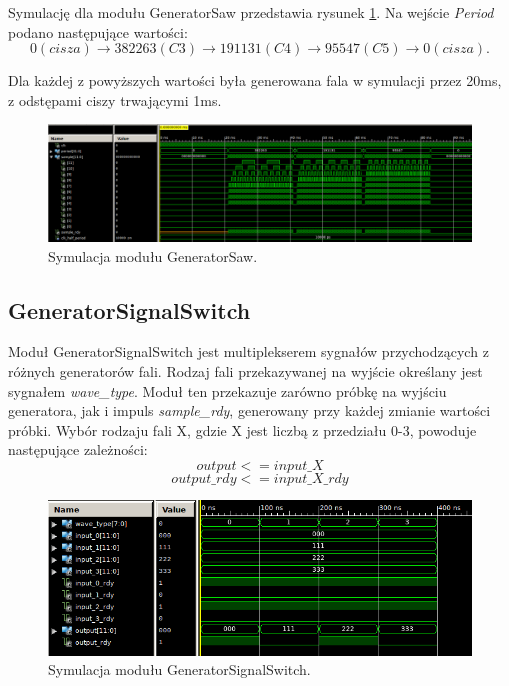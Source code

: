 \documentclass[12pt]{article}
\begin{document}
Symulację dla modułu GeneratorSaw przedstawia rysunek \ref{sim:gen_saw}. Na wejście \textit{Period} podano następujące wartości:
\begin{equation}
  0 (cisza) \rightarrow 382263 (C3) \rightarrow 191131 (C4) \rightarrow 95547 (C5) \rightarrow 0 (cisza).
\end{equation}

Dla każdej z powyższych wartości była generowana fala w symulacji przez 20ms, z odstępami ciszy trwającymi 1ms.

\begin{figure}[h]
  \centering
  \includegraphics[decodearray={1 0 1 0 1 0}, width=\linewidth]{images/generator_saw.png}
  \caption{Symulacja modułu GeneratorSaw.}
  \label{sim:gen_saw}
\end{figure}


\subsection{GeneratorSignalSwitch}

Moduł GeneratorSignalSwitch jest multiplekserem sygnałów przychodzących z różnych generatorów fali. Rodzaj fali przekazywanej na wyjście określany jest sygnałem \textit{wave\_type}. Moduł ten przekazuje zarówno próbkę na wyjściu generatora, jak i impuls \textit{sample\_rdy}, generowany przy każdej zmianie wartości próbki. Wybór rodzaju fali X, gdzie X jest liczbą z przedziału 0-3, powoduje następujące zależności:
\[output <= input\_X\]
\[output\_rdy <= input\_X\_rdy\]

\begin{figure}[h]
  \centering
  \includegraphics[decodearray={1 0 1 0 1 0}, width=\linewidth]{images/generator_signal_switch.png}
  \caption{Symulacja modułu GeneratorSignalSwitch.}
  \label{sim:gen_signal_switch}
\end{figure}
\end{document}
